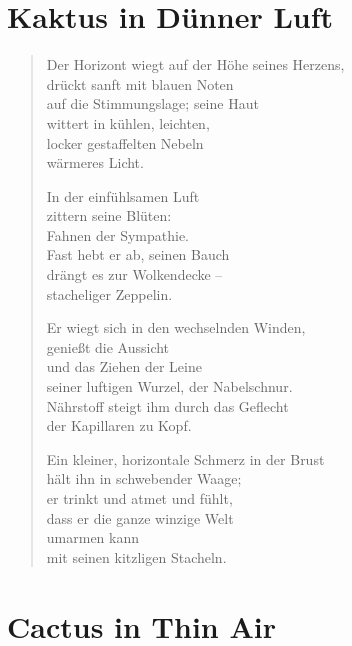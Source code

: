 
\cleartoverso

\section{Kaktus in Dünner Luft}

\vspace*{-\baselineskip}
\begin{verse}
Der Horizont wiegt auf der Höhe seines Herzens,\\
drückt sanft mit blauen Noten\\
auf die Stimmungslage; seine Haut\\
wittert in kühlen, leichten,\\
locker gestaffelten Nebeln\\
wärmeres Licht.

In der einfühlsamen Luft\\
zittern seine Blüten:\\
Fahnen der Sympathie.\\
Fast hebt er ab, seinen Bauch\\
drängt es zur Wolkendecke --\\
stacheliger Zeppelin.

Er wiegt sich in den wechselnden Winden,\\
genießt die Aussicht\\
und das Ziehen der Leine\\
seiner luftigen Wurzel, der Nabelschnur.\\
Nährstoff steigt ihm durch das Geflecht\\
der Kapillaren zu Kopf.

Ein kleiner, horizontale Schmerz in der Brust\\
hält ihn in schwebender Waage;\\
er trinkt und atmet und fühlt,\\
dass er die ganze winzige Welt\\
umarmen kann\\
mit seinen kitzligen Stacheln.
\end{verse}

\clearpage

\section{Cactus in Thin Air}


